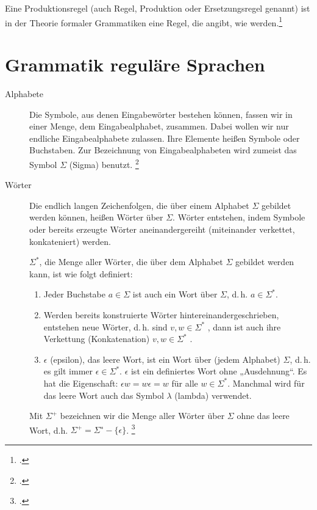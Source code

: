 \documentclass{lehramt-informatik-haupt}
\begin{document}
Eine Produktionsregel (auch Regel, Produktion oder Ersetzungsregel
genannt) ist in der Theorie formaler Grammatiken eine Regel, die angibt,
wie  werden.\footcite{wiki:produktionsregel}

%

\section{Grammatik reguläre Sprachen}

\begin{description}
\item[Alphabete]

Die Symbole, aus denen Eingabewörter bestehen können, fassen wir in
einer Menge, dem Eingabealphabet, zusammen. Dabei wollen wir nur
endliche Eingabealphabete zulassen. Ihre Elemente heißen Symbole oder
Buchstaben. Zur Bezeichnung von Eingabealphabeten wird zumeist das
Symbol $\Sigma$ (Sigma) benutzt.
\footcite[Seite 15]{vossen}

\item[Wörter]
Die endlich langen Zeichenfolgen, die über einem Alphabet $\Sigma$
gebildet werden können, heißen Wörter über $\Sigma$. Wörter entstehen,
indem Symbole oder bereits erzeugte Wörter aneinandergereiht
(miteinander verkettet, konkateniert) werden.

$\Sigma^*$, die Menge aller Wörter, die über dem Alphabet $\Sigma$
gebildet werden kann, ist wie folgt definiert:

\begin{enumerate}
\item Jeder Buchstabe $a \in \Sigma$ ist auch ein Wort über $\Sigma$,
d.\,h. $a \in \Sigma^*$.

\item Werden bereits konstruierte Wörter hintereinandergeschrieben,
entstehen neue Wörter, d.\,h. sind $v, w \in Σ^*$ , dann ist auch ihre
Verkettung (Konkatenation) $v, w \in Σ^*$ .

\item $\epsilon$ (epsilon), das leere Wort, ist ein Wort über (jedem
Alphabet) $\Sigma$, d.\,h. es gilt immer $\epsilon \in Σ^*$. $\epsilon$
ist ein definiertes Wort ohne „Ausdehnung“. Es hat die Eigenschaft:
$\epsilon w = w \epsilon = w$ für alle $w \in Σ^*$. Manchmal wird für
das leere Wort auch das Symbol $\lambda$ (lambda) verwendet.
\end{enumerate}

Mit $\Sigma^+$ bezeichnen wir die Menge aller Wörter über $\Sigma$ ohne
das leere Wort, d.h. $\Sigma^+ = \Sigma^∗ - \{ \epsilon \}$.
\footcite[Seite 16]{vossen}
\end{description}
\end{document}
